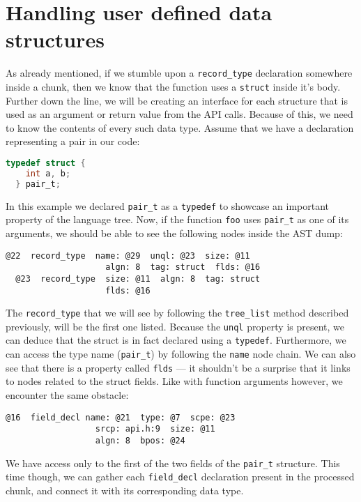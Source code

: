 \documentclass[polish, english]{iithesis}
\begin{document}
  \section{Handling user defined data structures}
As already mentioned, if we stumble upon a \texttt{record\_type} declaration somewhere inside a chunk, then we know that the function uses a \texttt{struct} inside it's body.
Further down the line, we will be creating an interface for each structure that is used as an argument or return value from the API calls.
Because of this, we need to know the contents of every such data type.
Assume that we have a declaration representing a pair in our code:
\begin{lstlisting}[language=C, caption=Example \texttt{struct} declaration]
  typedef struct {
    int a, b;
  } pair_t;
\end{lstlisting}
In this example we declared \texttt{pair\_t} as a \texttt{typedef} to showcase an important property of the language tree.
Now, if the function \texttt{foo} uses \texttt{pair\_t} as one of its arguments, we should be able to see the following nodes inside the AST dump:
\begin{lstlisting}[caption=Example \texttt{record\_type} nodes for the \texttt{pair\_t} type]
  @22  record_type  name: @29  unql: @23  size: @11     
                    algn: 8  tag: struct  flds: @16
  @23  record_type  size: @11  algn: 8  tag: struct  
                    flds: @16
\end{lstlisting}
The \texttt{record\_type} that we will see by following the \texttt{tree\_list} method described previously, will be the first one listed.
Because the \texttt{unql} property is present, we can deduce that the struct is in fact declared using a \texttt{typedef}.
Furthermore, we can access the type name (\texttt{pair\_t}) by following the \texttt{name} node chain.
We can also see that there is a property called \texttt{flds} --- it shouldn't be a surprise that it links to nodes related to the struct fields.
Like with function arguments however, we encounter the same obstacle:
\begin{lstlisting}[caption=Example \texttt{field\_decl} node]
  @16  field_decl name: @21  type: @7  scpe: @23     
                  srcp: api.h:9  size: @11     
                  algn: 8  bpos: @24
\end{lstlisting}
We have access only to the first of the two fields of the \texttt{pair\_t} structure.
This time though, we can gather each \texttt{field\_decl} declaration present in the processed chunk, and connect it with its corresponding data type.
\end{document}
